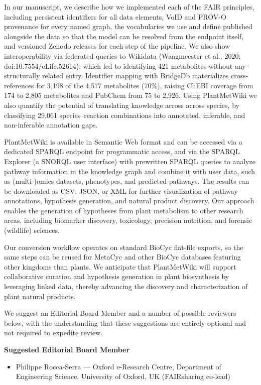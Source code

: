 \documentclass[11pt,a4paper]{article}
\begin{document}
In our manuscript, we describe how we implemented each of the FAIR principles, including persistent identifiers for all data elements, VoID and PROV-O provenance for every
named graph, the vocabularies we use and define published alongside the data so that the model can
be resolved from the endpoint itself, and versioned Zenodo releases for each step of the pipeline.
We also show interoperability via federated queries to Wikidata (Waagmeester et al., 2020;
doi:10.7554/eLife.52614), which led to identifying 421 metabolites without any structurally related entry. Identifier mapping with BridgeDb materializes cross-references for 3,198 of the 4,577
metabolites (70\%), raising ChEBI coverage from 174 to 2,805 metabolites and PubChem from 75 to
2,926. Using PlantMetWiki we also quantify the potential of translating knowledge across across species, by classifying 29,061
species--reaction combinations into annotated, inferable, and non-inferable annotation gaps.

PlantMetWiki is available in Semantic Web format and can be accessed via a dedicated SPARQL endpoint
for programmatic access, and via the SPARQL Explorer (a SNORQL user interface) with prewritten SPARQL queries to analyze
pathway information in the knowledge graph and combine it with user data, such as (multi-)omics
datasets, phenotypes, and predicted pathways. The results can be downloaded as CSV, JSON, or XML for
further visualization of pathway annotations, hypothesis generation, and natural product discovery.
Our approach enables the generation of
hypotheses from plant metabolism to other research areas, including biomarker discovery,
toxicology, precision nutrition, and forensic (wildlife) sciences.

Our conversion workflow operates on standard BioCyc flat-file exports, so the same steps can be
reused for MetaCyc and other BioCyc databases featuring other kingdoms than plants. We anticipate that PlantMetWiki will support
collaborative curation and hypothesis generation in plant biosynthesis by leveraging linked data,
thereby advancing the discovery and characterization of plant natural products.



We suggest an Editorial Board Member and a number of possible
reviewers below, with the understanding that these suggestions are entirely optional and not required
to expedite review.

\textbf{Suggested Editorial Board Member}
\begin{itemize}
  \setlength{\itemsep}{0.2em}
  \item Philippe Rocca-Serra --- Oxford e-Research Centre, Department of Engineering Science,
        University of Oxford, UK (FAIRsharing co-lead)
\end{itemize}
\end{document}
